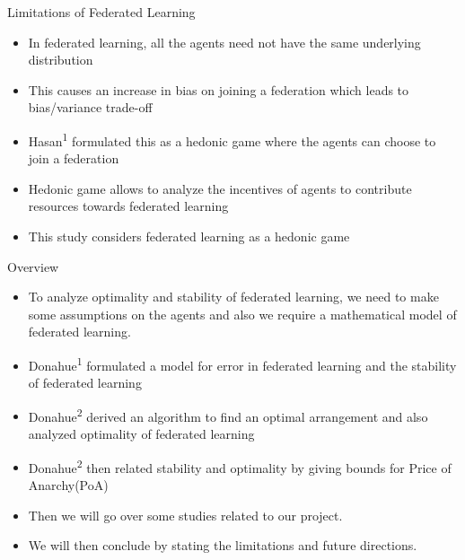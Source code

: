 \documentclass[aspectratio=169]{beamer}
\begin{document}
\begin{frame}[label={sec:org313ae7e}]{Limitations of Federated Learning}
\begin{itemize}
\item In federated learning, all the agents need not have the same underlying distribution
\item This causes an increase in bias on joining a federation which leads to bias/variance trade-off
\item Hasan\textsuperscript{1} formulated this as a hedonic game where the agents can choose to join a federation
\item Hedonic game allows to analyze the incentives of agents to contribute resources towards federated learning
\item This study considers federated learning as a hedonic game
\end{itemize}

\end{frame}

\begin{frame}[label={sec:orgd230bfb}]{Overview}
\begin{itemize}
\item To analyze optimality and stability of federated learning, we need to make some assumptions on the agents and also we require a mathematical model of federated learning.
\item Donahue\textsuperscript{1} formulated a model for error in federated learning and the stability of federated learning
\item Donahue\textsuperscript{2} derived an algorithm to find an optimal arrangement and also analyzed optimality of federated learning
\item Donahue\textsuperscript{2} then related stability and optimality by giving bounds for Price of Anarchy(PoA)
\item Then we will go over some studies related to our project.
\item We will then conclude by stating the limitations and future directions.
\end{itemize}

\end{frame}
\end{document}
